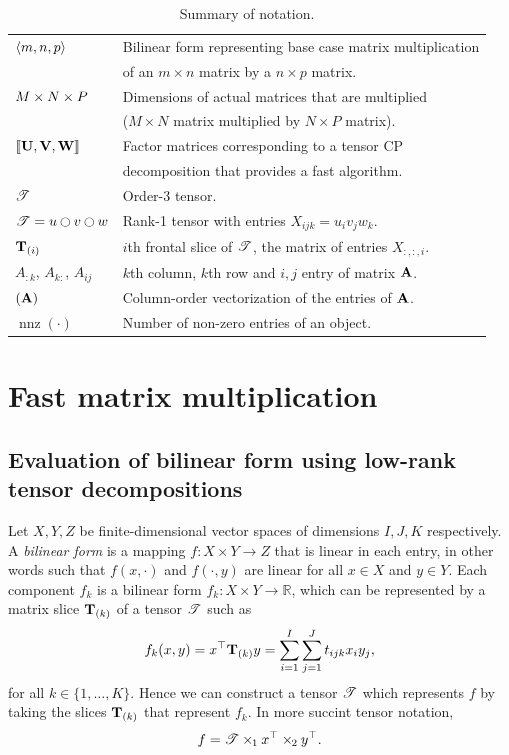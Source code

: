 \documentclass[a4paper, leqno, 11pt]{article}
\renewcommand{\mathbb}[1]{\mathds{#1}}
\newcommand{\R}{\mathbb{R}}
\let\Vec\relax
\DeclareMathOperator{\Vec}{vec}
\let\vec\relax
\DeclareRobustCommand{\vec}{\Vec}
\DeclareMathOperator{\nnz}{nnz}
\theoremstyle{definition}
\theoremstyle{remark}
\theoremstyle{experimental}
\begin{document}
\begin{table}[tb]
\centering
\caption{Summary of notation.}
\label{tab:notation}
\begin{tabular}{ll}
\toprule
$\angb{m,n,p}$ & Bilinear form representing base case matrix multiplication \\
& of an $m \times n$ matrix by a $n \times p$ matrix. \\
$\msiz{M,N,P}$ & Dimensions of actual matrices that are multiplied \\
& ($M \times N$ matrix multiplied by $N \times P$ matrix). \\
$\dsqr{\Mx{U}, \Mx{V}, \Mx{W}}$ & Factor matrices corresponding to a tensor CP \\
& decomposition that provides a fast algorithm. \\
$\Tn{T}$ & Order-3 tensor. \\
$\Tn{T} = u \topp v \topp w$ & Rank-1 tensor with entries $X_{ijk} = u_i v_j w_k$. \\
$\Tm{T}{i}$ & $i$th frontal slice of $\Tn{T}$, the matrix of entries $X_{:,:,i}$. \\
$A_{:k}$, $A_{k:}$, $A_{ij}$ & $k$th column, $ k $th row and $i, j$ entry of matrix $\Mx{A}$. \\
$\vec(\Mx{A})$ & Column-order vectorization of the entries of $\Mx{A}$. \\
$\nnz(\cdot)$ & Number of non-zero entries of an object. \\
\bottomrule
\end{tabular}
\end{table}


\section{Fast matrix multiplication}
\label{sec:fast_matmul}

\subsection{Evaluation of bilinear form using low-rank tensor decompositions}

Let $ X,Y,Z $ be finite-dimensional vector spaces of dimensions $ I,J,K $ respectively. A
\emph{bilinear form} is a mapping $ f : X \times Y \to
Z$ that is linear in each entry, in other words such that $ f(x, \cdot) $ and $ f(\cdot,y) $ are linear for all
$ x\in X $ and $ y\in Y $. Each component $ f_k $ is a bilinear form $ f_k : X \times Y \to \R$,
which can be represented by a matrix slice $ \Tm{t}{k} $ of a tensor $ \Tn{t} $ such as 
\begin{equation}
\label{eq:bil_tensor_full}
f_k(x,y) = x^{\top}\Tm{t}{k}y = \sum_{i=1}^I \sum_{j=1}^J t_{ijk}x_iy_j,
\end{equation} for all $ k \in \{1,\ldots, K\}  $. Hence we can construct a tensor $ \Tn{t} $ which represents $ f $ by taking the slices $ \Tm{t}{k} $ that represent $ f_k $. In more succint tensor notation, 
\begin{equation}
  \label{eq:bil_tensor}
 f = \Tn{t} \ttm[1] x^{\top} \ttm[2] y^{\top}.
\end{equation}
\end{document}
